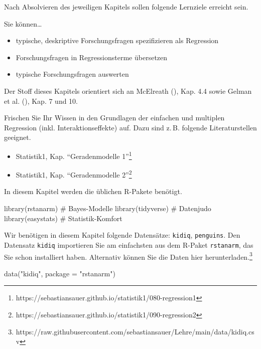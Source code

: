 \documentclass[
  ngerman,
  letterpaper,
  twoside,
  open=any]{scrbook}
\newenvironment{Shaded}{\begin{snugshade}}{\end{snugshade}}
\newcommand{\AttributeTok}[1]{\textcolor[rgb]{0.40,0.45,0.13}{#1}}
\newcommand{\CommentTok}[1]{\textcolor[rgb]{0.37,0.37,0.37}{#1}}
\newcommand{\FunctionTok}[1]{\textcolor[rgb]{0.28,0.35,0.67}{#1}}
\newcommand{\NormalTok}[1]{\textcolor[rgb]{0.00,0.23,0.31}{#1}}
\newcommand{\StringTok}[1]{\textcolor[rgb]{0.13,0.47,0.30}{#1}}
\providecommand{\tightlist}{%
  \setlength{\itemsep}{0pt}\setlength{\parskip}{0pt}}\usepackage{longtable,booktabs,array}
\theoremstyle{definition}
\theoremstyle{plain}
\theoremstyle{definition}
\theoremstyle{definition}
\theoremstyle{definition}
\theoremstyle{definition}
\theoremstyle{remark}
\begin{document}
Nach Absolvieren des jeweiligen Kapitels sollen folgende Lernziele
erreicht sein.

Sie können\ldots{}

\begin{itemize}
\tightlist
\item
  typische, deskriptive Forschungsfragen spezifizieren als Regression
\item
  Forschungsfragen in Regressionsterme übersetzen
\item
  typische Forschungsfragen auswerten
\end{itemize}

Der Stoff dieses Kapitels orientiert sich an McElreath
(), Kap. 4.4 sowie Gelman et al.
(), Kap. 7 und 10.

Frischen Sie Ihr Wissen in den Grundlagen der einfachen und multiplen
Regression (inkl. Interaktionseffekte) auf. Dazu sind z.\,B. folgende
Literaturstellen geeignet.

\begin{itemize}
\tightlist
\item
  Statistik1, Kap. \enquote{Geradenmodelle 1}\footnote{https://sebastiansauer.github.io/statistik1/080-regression1}
\item
  Statistik1, Kap. \enquote{Geradenmodelle 2}\footnote{https://sebastiansauer.github.io/statistik1/090-regression2}
\end{itemize}

In diesem Kapitel werden die üblichen R-Pakete benötigt.

\begin{Shaded}
\begin{Highlighting}[]
\FunctionTok{library}\NormalTok{(rstanarm)   }\CommentTok{\# Bayes{-}Modelle}
\FunctionTok{library}\NormalTok{(tidyverse)  }\CommentTok{\# Datenjudo}
\FunctionTok{library}\NormalTok{(easystats)  }\CommentTok{\# Statistik{-}Komfort}
\end{Highlighting}
\end{Shaded}

Wir benötigen in diesem Kapitel folgende Datensätze: \texttt{kidiq},
\texttt{penguins}. Den Datensatz \texttt{kidiq} importieren Sie am
einfachsten aus dem R-Paket \texttt{rstanarm}, das Sie schon installiert
haben. Alternativ können Sie die Daten hier herunterladen.\footnote{https://raw.githubusercontent.com/sebastiansauer/Lehre/main/data/kidiq.csv}

\begin{Shaded}
\begin{Highlighting}[]
\FunctionTok{data}\NormalTok{(}\StringTok{"kidiq"}\NormalTok{, }\AttributeTok{package =} \StringTok{"rstanarm"}\NormalTok{)}
\end{Highlighting}
\end{Shaded}
\end{document}
